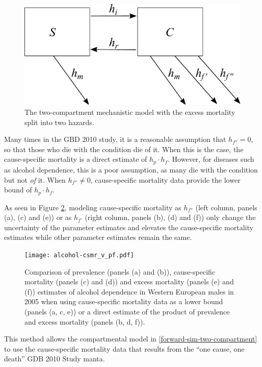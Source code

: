     \begin{figure}[h]
        \begin{center}
            \includegraphics[width=\textwidth]{SC2.pdf}
            \caption{The two-compartment mechanistic model with the
              excess mortality split into two hazards.}
            \label{fig:two_compartment_2f}
        \end{center}
    \end{figure}

Many times in the GBD 2010 study, it is a reasonable assumption that
$h_{f''} = 0$, so that those who die with the condition die of it.
When this is the case, the cause-specific mortality is a direct
estimate of $h_{p} \cdot h_{f}$.  However, for diseases such as alcohol
dependence, this is a poor assumption, as many die with the condition
but not \emph{of} it.  When $h_{f''} \neq 0$, cause-specific mortality
data provide the lower bound of $h_{p} \cdot h_{f}$.  

As seen in Figure \ref{fig:app-alcohol compare}, modeling cause-specific mortality as
$h_{f''}$ (left column, panels (a), (c) and (e)) or as $h_{f'}$ (right
column, panels (b), (d) and (f)) only change the uncertainty of the
parameter estimates and elevates the cause-specific mortality
estimates while other parameter estimates remain the same.

    \begin{figure}[h]
        \begin{center}
            \texttt{[image: alcohol-csmr\_v\_pf.pdf]}
            \caption{Comparison of prevalence (panels (a) and (b)),
              cause-specific mortality (panels (c) and (d)) and excess
              mortality (panels (e) and (f)) estimates of alcohol
              dependence in Western European males in 2005 when using
              cause-specific mortality data as a lower bound (panels
              (a, c, e)) or a direct estimate of the product of
              prevalence and excess mortality (panels (b, d, f)).}
            \label{fig:app-alcohol compare}
        \end{center}
    \end{figure}
    
This method allows the compartmental model in \ref{forward-sim-two-compartment}
to use the cause-specific mortality data that results from the ``one cause, one death''
GDB 2010 Study manta.

